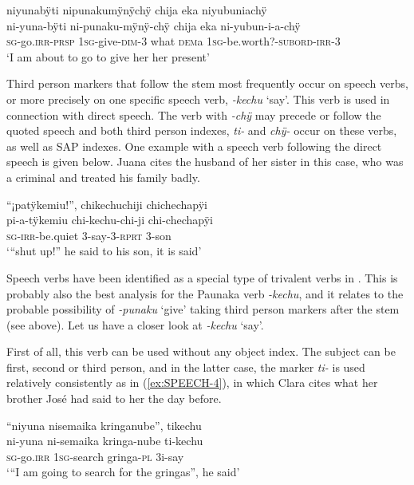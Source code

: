 \ea\label{ex:ditr-new-3}
\begingl
\glpreamble niyunabÿti nipunakumÿnÿchÿ chija eka niyubuniachÿ\\
\gla ni-yuna-bÿti ni-punaku-mÿnÿ-chÿ chija eka ni-yubun-i-a-chÿ\\
\textsc{sg}-go.\textsc{irr}-\textsc{prsp} 1\textsc{sg}-give-\textsc{dim}-3 what \textsc{dem}a 1\textsc{sg}-be.worth?-\textsc{subord}-\textsc{irr}-3\\
\glft ‘I am about to go to give her her present’
\endgl
{}
\xe

Third person markers that follow the stem most frequently occur on speech verbs, or more precisely on one specific speech verb, \textit{-kechu} ‘say’. This verb is used in connection with direct speech. The verb with \textit{-chÿ} may precede or follow the quoted speech and both third person indexes, \textit{ti-} and \textit{chÿ-} occur on these verbs, as well as SAP indexes. One example with a speech verb following the direct speech is given below. Juana cites the husband of her sister in this case, who was a criminal and treated his family badly.

\ea\label{ex:SPEECH-1}
\begingl 
\glpreamble “¡patÿkemiu!”, chikechuchiji chichechapÿi\\
\gla pi-a-tÿkemiu chi-kechu-chi-ji chi-chechapÿi\\ 
\textsc{sg}-\textsc{irr}-be.quiet 3-say-3-\textsc{rprt} 3-son\\ 
\glft ‘“shut up!” he said to his son, it is said’
\trailingcitation{[jxx-p120430l-2.181]}
\xe

Speech verbs have been identified as a special type of trivalent verbs in  \citep[]{Rose2011b}. This is probably also the best analysis for the Paunaka verb \textit{-kechu}, and it relates to the probable possibility of \textit{-punaku} ‘give’ taking third person markers after the stem (see above). Let us have a closer look at \textit{-kechu} ‘say’.

First of all, this verb can be used without any object index. The subject can be first, second or third person, and in the latter case, the marker \textit{ti-} is used relatively consistently as in (\ref{ex:SPEECH-4}), in which Clara cites what her brother José had said to her the day before.

\ea\label{ex:SPEECH-4}
\begingl
\glpreamble “niyuna nisemaika kringanube”, tikechu\\
\gla ni-yuna ni-semaika kringa-nube ti-kechu\\
\textsc{sg}-go.\textsc{irr} 1\textsc{sg}-search gringa-\textsc{pl} 3i-say\\
\glft ‘“I am going to search for the gringas”, he said’
\endgl
\trailingcitation{[cux-c120510l-1.127]}
\xe

